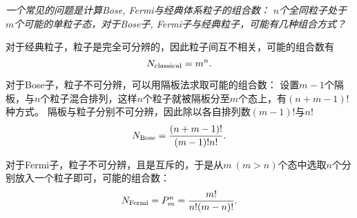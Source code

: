 \begin{tcolorbox}[breakable, colframe=purple, colback=red!10, title={\textbf{Bose, Fermi与经典体系粒子的组合数计算}}]
    \it\small
    一个常见的问题是计算Bose, Fermi与经典体系粒子的组合数：
    $n$个全同粒子处于$m$个可能的单粒子态，对于Bose子, Fermi子与经典粒子，可能有几种组合方式？

    对于经典粒子，粒子是完全可分辨的，因此粒子间互不相关，可能的组合数有
    \begin{equation}
        N_{\rm{classical}} = m^n.
    \end{equation}

    对于Bose子，粒子不可分辨，可以用隔板法求取可能的组合数：
    设置$m-1$个隔板，与$n$个粒子混合排列，这样$n$个粒子就被隔板分至$m$个态上，有$(n+m-1)!$种方式。
    隔板与粒子分别不可分辨，因此除以各自排列数$(m-1)!$与$n!$
    \begin{equation}
        N_{\rm{Bose}} = \frac{(n+m-1)!}{(m-1)! n!}.
    \end{equation}

    对于Fermi子，粒子不可分辨，且是互斥的，于是从$m\ (m>n)$个态中选取$n$个分别放入一个粒子即可，可能的组合数：
    \begin{equation}
        N_{\rm{Fermi}} = P_m^n = \frac{m!}{n!(m-n)!}.
    \end{equation}

\end{tcolorbox}
